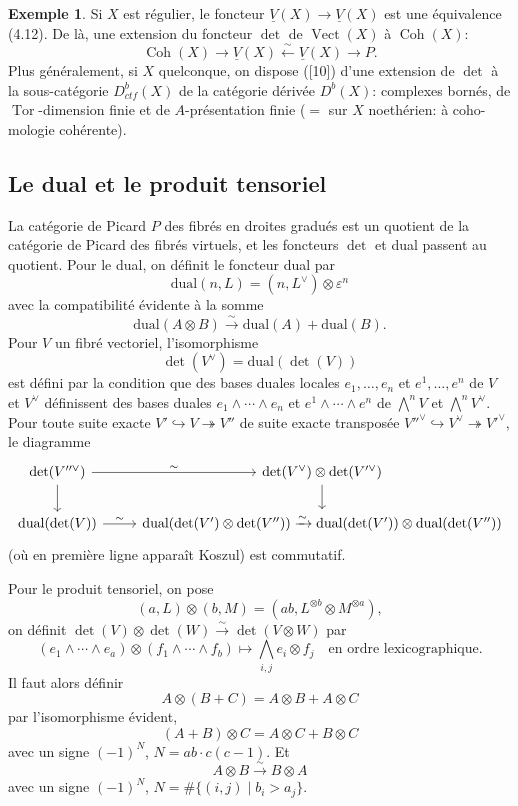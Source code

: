 \documentclass[12pt,a4paper]{article}
\theoremstyle{plain}
\theoremstyle{definition}
\newtheorem{example}[theorem]{Exemple}
\DeclareMathOperator{\Vect}{Vect}
\DeclareMathOperator{\Coh}{Coh}
\DeclareMathOperator{\Tor}{Tor}
\begin{document}
\begin{example}
Si $X$ est r\'egulier, le foncteur $\underline{V}(X) \to \underline{V}(X)$ est une \'equivalence (4.12).
De l\`a, une extension du foncteur $\det$ de $\Vect(X)$ \`a $\Coh(X)$:
\[
\Coh(X) \to \underline{V}(X) \xleftarrow{\sim} \underline{V}(X) \to P .
\]
Plus g\'en\'eralement, si $X$ quelconque, on dispose ([10]) d'une extension de $\det$
\`a la sous-cat\'egorie $D^b_{ctf}(X)$ de la cat\'egorie d\'eriv\'ee $D^b(X)$: complexes born\'es,
de $\Tor$-dimension finie et de $A$-pr\'esentation finie ($=$ sur $X$ noeth\'erien: \`a coho-
mologie coh\'erente).
\end{example}

\subsection{Le dual et le produit tensoriel}

La cat\'egorie de Picard $P$ des fibr\'es en droites gradu\'es est un quotient
de la cat\'egorie de Picard des fibr\'es virtuels, et les foncteurs $\det$ et dual passent
au quotient. Pour le dual, on d\'efinit le foncteur dual par
\[
\text{dual}(n, L) = (n, L^\vee) \otimes \varepsilon^n
\]
avec la compatibilit\'e \'evidente \`a la somme
\[
\text{dual}(A \otimes B) \xrightarrow{\sim} \text{dual}(A) + \text{dual}(B) .
\]
Pour $V$ un fibr\'e vectoriel, l'isomorphisme
\[
\det(V^\vee) = \text{dual}(\det(V))
\]
est d\'efini par la condition que des bases duales locales $e_1, \ldots, e_n$ et $e^1, \ldots,
e^n$ de $V$ et $V^\vee$ d\'efinissent des bases duales $e_1 \wedge \cdots \wedge e_n$ et $e^1 \wedge \cdots \wedge
e^n$ de $\bigwedge^n V$ et $\bigwedge^n V^\vee$. Pour toute suite exacte $V' \hookrightarrow V \twoheadrightarrow V''$ de suite exacte transpos\'ee
$V''^\vee \hookrightarrow V^\vee \twoheadrightarrow V'^\vee$, le diagramme
\[
\begin{tikzcd}
\det(V''^\vee) \arrow[r, "\sim"] \arrow[d] & \det(V^\vee) \otimes \det(V'^\vee) \arrow[d] \\
\text{dual}(\det(V)) \arrow[r, "\sim"] & \text{dual}(\det(V') \otimes \det(V'')) \xrightarrow{\sim} \text{dual}(\det(V')) \otimes \text{dual}(\det(V''))
\end{tikzcd}
\]
(o\`u en premi\`ere ligne appara\^it Koszul) est commutatif.

Pour le produit tensoriel, on pose
\[
(a, L) \otimes (b, M) = (ab, L^{\otimes b} \otimes M^{\otimes a}) ,
\]
on d\'efinit $\det(V) \otimes \det(W) \xrightarrow{\sim} \det(V \otimes W)$ par
\[
(e_1 \wedge \cdots \wedge e_a) \otimes (f_1 \wedge \cdots \wedge f_b) \longmapsto \bigwedge_{i,j} e_i \otimes f_j \quad \text{en ordre lexicographique.}
\]
Il faut alors d\'efinir
\[
A \otimes (B + C) = A \otimes B + A \otimes C
\]
par l'isomorphisme \'evident,
\[
(A + B) \otimes C = A \otimes C + B \otimes C
\]
avec un signe $(-1)^N$, $N = ab \cdot c(c-1)$. Et
\[
A \otimes B \xrightarrow{\sim} B \otimes A
\]
avec un signe $(-1)^N$, $N = \#\{(i,j) \mid b_i > a_j\}$.
\end{document}
